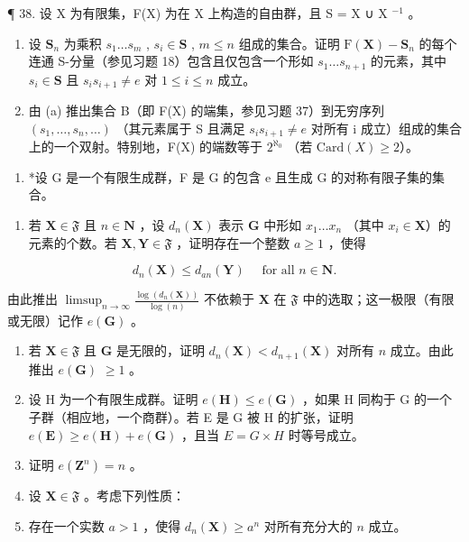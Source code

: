 ¶ 38. 设 X 为有限集，F(X) 为在 X 上构造的自由群，且 S = X ∪ X \(^{-1}\) 。

\begin{enumerate}
\def\labelenumi{(\alph{enumi})}
\item
  设 \(\mathbf{S}_n\) 为乘积 \(s_1 \ldots s_m\) , \(s_i \in \mathbf{S}\) , \(m \leqslant n\) 组成的集合。证明 \(\mathrm{F}(\mathbf{X}) - \mathbf{S}_n\) 的每个连通 S-分量（参见习题 18）包含且仅包含一个形如 \(s_1 \ldots s_{n+1}\) 的元素，其中 \(s_i \in \mathbf{S}\) 且 \(s_i s_{i+1} \neq e\) 对 \(1 \leqslant i \leqslant n\) 成立。
\item
  由 (a) 推出集合 B（即 F(X) 的端集，参见习题 37）到无穷序列 \((s_{1},\ldots,s_{n},\ldots)\) （其元素属于 S 且满足 \(s_{i}s_{i+1}\neq e\) 对所有 i 成立）组成的集合上的一个双射。特别地，F(X) 的端数等于 \(2^{\aleph_0}\) （若 \(\text{Card}(X)\geqslant2\)）。
\end{enumerate}

\begin{enumerate}
\def\labelenumi{\arabic{enumi}.}
\setcounter{enumi}{38}
\tightlist
\item
  *设 G 是一个有限生成群，F 是 G 的包含 e 且生成 G 的对称有限子集的集合。
\end{enumerate}

\begin{enumerate}
\def\labelenumi{(\alph{enumi})}
\tightlist
\item
  若 \(\mathbf{X} \in \mathfrak{F}\) 且 \(n \in \mathbf{N}\) ，设 \(d_n(\mathbf{X})\) 表示 \(\mathbf{G}\) 中形如 \(x_1 \ldots x_n\) （其中 \(x_i \in \mathbf{X}\)）的元素的个数。若 \(\mathbf{X}, \mathbf{Y} \in \mathfrak{F}\) ，证明存在一个整数 \(a \geqslant 1\) ，使得
\end{enumerate}

\[
d _ {n} (\mathbf {X}) \leqslant d _ {a n} (\mathbf {Y}) \quad \text { for   all } n \in \mathbf {N}.
\]

由此推出 \(\limsup_{n\to \infty}\frac{\log(d_n(\mathbf{X}))}{\log(n)}\) 不依赖于 \(\mathbf{X}\) 在 \(\mathfrak{F}\) 中的选取；这一极限（有限或无限）记作 \(e(\mathbf{G})\) 。

\begin{enumerate}
\def\labelenumi{(\alph{enumi})}
\setcounter{enumi}{1}
\item
  若 \(\mathbf{X} \in \mathfrak{F}\) 且 \(\mathbf{G}\) 是无限的，证明 \(d_n(\mathbf{X}) < d_{n+1}(\mathbf{X})\) 对所有 \(n\) 成立。由此推出 \(e(\mathbf{G})\) \(\geqslant 1\) 。
\item
  设 H 为一个有限生成群。证明 \(e(\mathbf{H}) \leqslant e(\mathbf{G})\) ，如果 H 同构于 G 的一个子群（相应地，一个商群）。若 E 是 G 被 H 的扩张，证明 \(e(\mathbf{E}) \geqslant e(\mathbf{H}) + e(\mathbf{G})\) ，且当 \(E = G \times H\) 时等号成立。
\item
  证明 \(e(\mathbf{Z}^n) = n\) 。
\item
  设 \(\mathbf{X} \in \mathfrak{F}\) 。考虑下列性质：
\item
  存在一个实数 \(a > 1\) ，使得 \(d_n(\mathbf{X}) \geqslant a^n\) 对所有充分大的 \(n\) 成立。
\end{enumerate}

